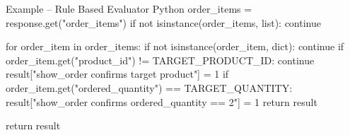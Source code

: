 \begin{tcbCodeListing}{Example -- Rule Based Evaluator
}{Python}
        order_items = response.get("order_items")
        if not isinstance(order_items, list):
            continue

        for order_item in order_items:
            if not isinstance(order_item, dict):
                continue
            if order_item.get("product_id") != TARGET_PRODUCT_ID:
                continue
            result["show_order confirms target product"] = 1
            if order_item.get("ordered_quantity") == TARGET_QUANTITY:
                result["show_order confirms ordered_quantity == 2"] = 1
            return result

    return result
\end{tcbCodeListing}